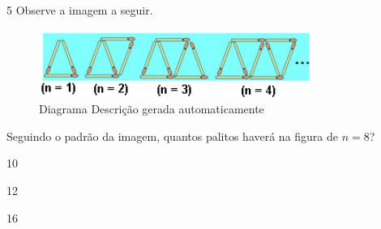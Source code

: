 \begin{escolha}
\begin{boxmedio}
\begin{boxmedio}
{\begin{boxpeq}
\begin{boxpeq}
{\begin{boxpeq}
\begin{boxmedio}
\begin{boxmedio}
\begin{boxpeq}
\begin{boxmedio}
\begin{boxpeq}
\begin{boxpeq}
\begin{boxpeq}
\begin{boxpeq}
\begin{boxmedio}
{\begin{boxmedio}
\begin{boxmedio}
\begin{boxpeq}
\begin{boxmedio}
\begin{boxpeq}
\begin{boxpeq}
\begin{boxpeq}
\begin{escolha}
{\begin{boxmedio}
\begin{boxpeq}
\begin{boxpeq}
\begin{boxpeq}
\begin{boxpeq}
\begin{boxpeq}
\begin{boxmedio}
\begin{boxpeq}
\begin{boxpeq}
\begin{boxpeq}
{\begin{boxpeq}
\begin{boxmedio}
\begin{boxpeq}
\begin{boxpeq}
\begin{boxpeq}
{\begin{boxpeq}
\begin{boxmedio}
{\begin{boxpeq}
\begin{boxpeq}
\begin{boxmedio}
\begin{boxmedio}
\begin{boxpeq}
\begin{boxpeq}
{\begin{boxpeq}
\begin{boxpeq}
\begin{boxpeq}
\begin{boxpeq}
\begin{boxpeq}
\begin{escolha}
\begin{escolha}
{\begin{boxmedio}
\begin{boxpeq}
\begin{q°}
\begin{boxmedio}
\begin{boxpeq}
\begin{boxpeq}
\begin{boxmedio}
\begin{boxmedio}
\begin{boxmedio}
\begin{boxmedio}
{\begin{enumerate}
\begin{boxpeq}
{\begin{boxpeq}
\begin{boxpeq}
\begin{boxmedio}
\begin{boxpeq}
\begin{boxpeq}
\begin{boxpeq}
\num{5} Observe a imagem a seguir. 

\begin{figure}
\centering
\includegraphics[width=3.5in,height=0.875in]{./_SAEB_9_MAT/media/image241.png}
\caption{Diagrama Descrição gerada automaticamente}
\end{figure}


Seguindo o padrão da imagem, quantos palitos haverá na figura de $n = 8$?

\begin{escolha}

  \item 10

  \item 12

  \item 16


\end{escolha}
\end{boxpeq}
\end{boxpeq}
\end{boxpeq}
\end{boxmedio}
\end{boxpeq}
\end{boxpeq}}
\end{boxpeq}
\end{enumerate}}
\end{boxmedio}
\end{boxmedio}
\end{boxmedio}
\end{boxmedio}
\end{boxpeq}
\end{boxpeq}
\end{boxmedio}
\end{q°}
\end{boxpeq}
\end{boxmedio}}
\end{escolha}
\end{escolha}
\end{boxpeq}
\end{boxpeq}
\end{boxpeq}
\end{boxpeq}
\end{boxpeq}}
\end{boxpeq}
\end{boxpeq}
\end{boxmedio}
\end{boxmedio}
\end{boxpeq}
\end{boxpeq}}
\end{boxmedio}
\end{boxpeq}}
\end{boxpeq}
\end{boxpeq}
\end{boxpeq}
\end{boxmedio}
\end{boxpeq}}
\end{boxpeq}
\end{boxpeq}
\end{boxpeq}
\end{boxmedio}
\end{boxpeq}
\end{boxpeq}
\end{boxpeq}
\end{boxpeq}
\end{boxpeq}
\end{boxmedio}}
\end{escolha}
\end{boxpeq}
\end{boxpeq}
\end{boxpeq}
\end{boxmedio}
\end{boxpeq}
\end{boxmedio}
\end{boxmedio}}
\end{boxmedio}
\end{boxpeq}
\end{boxpeq}
\end{boxpeq}
\end{boxpeq}
\end{boxmedio}
\end{boxpeq}
\end{boxmedio}
\end{boxmedio}
\end{boxpeq}}
\end{boxpeq}
\end{boxpeq}}
\end{boxmedio}
\end{boxmedio}
\end{escolha}

